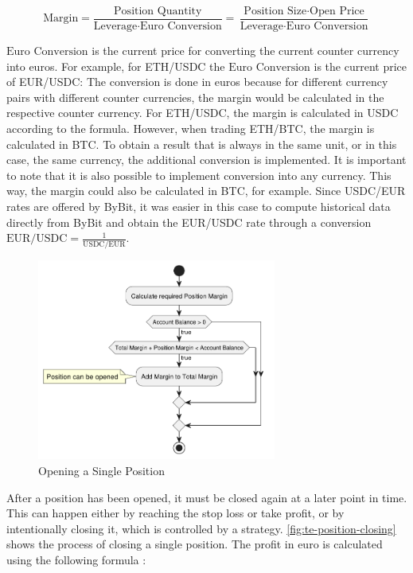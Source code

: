 \[
    \text{Margin} = \frac{\text{Position Quantity}}{\text{Leverage} \cdot \text{Euro Conversion}} = \frac{\text{Position Size} \cdot \text{Open Price}}{\text{Leverage} \cdot \text{Euro Conversion}}
\]

\noindent
$\text{Euro Conversion}$ is the current price for converting the current counter currency into euros.
For example, for ETH/USDC the $\text{Euro Conversion}$ is the current price of EUR/USDC:
The conversion is done in euros because for different currency pairs with different counter currencies, the margin would be calculated in the respective counter currency.
For ETH/USDC, the margin is calculated in USDC according to the formula.
However, when trading ETH/BTC, the margin is calculated in BTC.
To obtain a result that is always in the same unit, or in this case, the same currency, the additional conversion is implemented.
It is important to note that it is also possible to implement conversion into any currency.
This way, the margin could also be calculated in BTC, for example.
Since USDC/EUR rates are offered by ByBit, it was easier in this case to compute historical data directly from ByBit and obtain the EUR/USDC rate through a conversion $\text{EUR/USDC} = \frac{1}{\text{USDC/EUR}}$.

\begin{figure}[H]
    \centering
    \includegraphics[width=0.7\textwidth]{images/trading-engine/position-opening}
    \caption{Opening a Single Position}
    \label{fig:te-position-opening}
\end{figure}

\noindent
After a position has been opened, it must be closed again at a later point in time.
This can happen either by reaching the stop loss or take profit, or by intentionally closing it, which is controlled by a strategy.
\autoref{fig:te-position-closing} shows the process of closing a single position.
The profit in euro is calculated using the following formula \cite{margin-calculation}:


